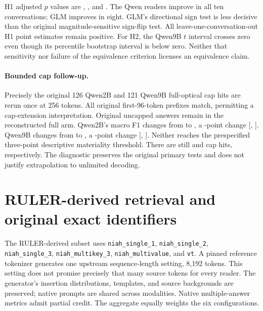 H1 adjusted $p$ values are , , and . The Qwen readers improve in all ten conversations; GLM improves in eight. GLM's directional sign test is less decisive than the original magnitude-sensitive sign-flip test. All leave-one-conversation-out H1 point estimates remain positive. For H2, the Qwen9B $t$ interval crosses zero even though its percentile bootstrap interval is below zero. Neither that sensitivity nor failure of the equivalence criterion licenses an equivalence claim.

\begin{table}[ht]\centering\small
\caption{Conversation-level sensitivity. $+/-$ count positive/negative differences. Sign $p_+$ tests a positive direction and should not be interpreted as a test of disadvantage for H2. Intervals are descriptive $t$ intervals over ten cluster differences.}

\end{table}

\paragraph{Bounded cap follow-up.}
Precisely the original 126 Qwen2B and 121 Qwen9B full-optical cap hits are rerun once at 256 tokens. All original first-96-token prefixes match, permitting a cap-extension interpretation. Original uncapped answers remain in the reconstructed full arm. Qwen2B's macro F1 changes from  to , a -point change [, ]. Qwen9B changes from  to , a -point change [, ]. Neither reaches the prespecified three-point descriptive materiality threshold. There are still  and  cap hits, respectively. The diagnostic preserves the original primary tests and does not justify extrapolation to unlimited decoding.

\section{RULER-derived retrieval and original exact identifiers}
\label{app:original}
The RULER-derived subset uses \texttt{niah\_single\_1}, \texttt{niah\_single\_2}, \texttt{niah\_single\_3}, \texttt{niah\_multikey\_3}, \texttt{niah\_multivalue}, and \texttt{vt}. A pinned reference tokenizer generates one upstream sequence-length setting, 8,192 tokens. This setting does not promise precisely that many source tokens for every reader. The generator's insertion distributions, templates, and source backgrounds are preserved; native prompts are shared across modalities. Native multiple-answer metrics admit partial credit. The aggregate equally weights the six configurations.

